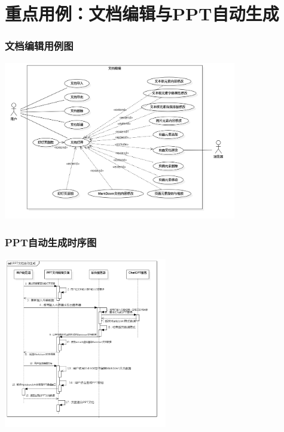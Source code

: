 \section{重点用例：文档编辑与PPT自动生成}
\begin{frame}
    \frametitle{文档编辑用例图}
    \center
    \includegraphics[width=4.0in]{contents/figure/ppt_generator_usercase_diagram.png}
\end{frame}
\begin{frame}
    \frametitle{PPT自动生成时序图}
    \center
    \includegraphics[width=2.8in]{contents/figure/ppt_generator_sequence_diagram.png}
\end{frame}